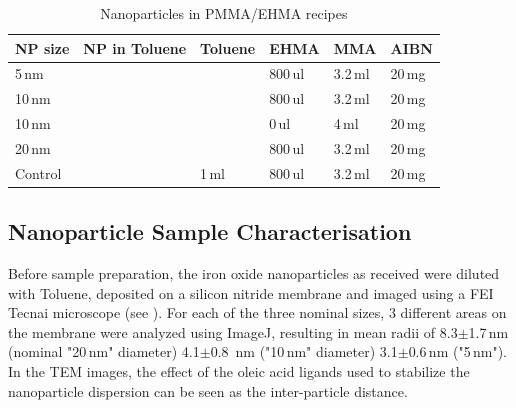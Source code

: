\begin{table}[tp]
	\centering
	\caption{Nanoparticles in PMMA/EHMA recipes}
	\label{tab:sampleCP}
	\begin{tabular}{llllll}
		\hline
		NP size &NP in Toluene&Toluene & EHMA & MMA & AIBN \\
		\hline
		5\,nm& & &800\,ul&  3.2\,ml&   20\,mg    \\
		10\,nm& & &800\,ul&  3.2\,ml&   20\,mg    \\
		10\,nm& & &0\,ul&  4\,ml&   20\,mg    \\
		20\,nm& & &800\,ul&  3.2\,ml&   20\,mg    \\
			Control& & 1\,ml&800\,ul&  3.2\,ml&   20\,mg    \\
		\hline
	\end{tabular}
\end{table}

\subsection{Nanoparticle Sample Characterisation}
Before sample preparation, the iron oxide nanoparticles as received were diluted with Toluene, deposited on a silicon nitride membrane and imaged using a FEI Tecnai microscope  (see ).  For each of the three nominal sizes, 3 different areas on the membrane were analyzed using ImageJ, resulting in mean radii of 8.3$\pm$1.7\,nm (nominal "20\,nm" diameter) 4.1$\pm$0.8 \,nm	("10\,nm" diameter) 3.1$\pm$0.6\,nm ("5\,nm"). In the TEM images, the effect of the oleic acid ligands used to stabilize the nanoparticle dispersion can be seen as the inter-particle distance.

